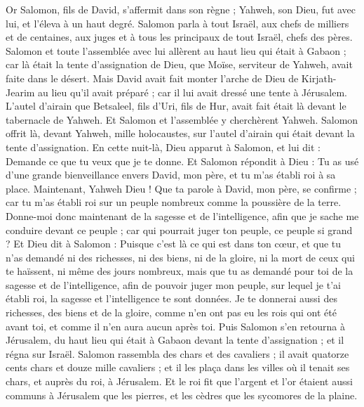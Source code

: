 \begin{multicols}{2}
\VerseOne{}Or Salomon, fils de David, s'affermit dans son règne ; Yahweh, son Dieu, fut avec lui, et l'éleva à un haut degré.
Salomon parla à tout Israël, aux chefs de milliers et de centaines, aux juges et à tous les principaux de tout Israël, chefs des pères.
Salomon et toute l'assemblée avec lui allèrent au haut lieu qui était à Gabaon ; car là était la tente d'assignation de Dieu, que Moïse, serviteur de Yahweh, avait faite dans le désert.
Mais David avait fait monter l'arche de Dieu de Kirjath-Jearim au lieu qu'il avait préparé ; car il lui avait dressé une tente à Jérusalem.
L'autel d'airain que Betsaleel, fils d'Uri, fils de Hur, avait fait était là devant le tabernacle de Yahweh. Et Salomon et l'assemblée y cherchèrent Yahweh.
Salomon offrit là, devant Yahweh, mille holocaustes, sur l'autel d'airain qui était devant la tente d'assignation.
En cette nuit-là, Dieu apparut à Salomon, et lui dit : Demande ce que tu veux que je te donne.
Et Salomon répondit à Dieu : Tu as usé d’une grande bienveillance envers David, mon père, et tu m'as établi roi à sa place.
Maintenant, Yahweh Dieu ! Que ta parole à David, mon père, se confirme ; car tu m'as établi roi sur un peuple nombreux comme la poussière de la terre.
Donne-moi donc maintenant de la sagesse et de l'intelligence, afin que je sache me conduire devant ce peuple ; car qui pourrait juger ton peuple, ce peuple si grand ?
Et Dieu dit à Salomon : Puisque c'est là ce qui est dans ton cœur, et que tu n'as demandé ni des richesses, ni des biens, ni de la gloire, ni la mort de ceux qui te haïssent, ni même des jours nombreux, mais que tu as demandé pour toi de la sagesse et de l'intelligence, afin de pouvoir juger mon peuple, sur lequel je t'ai établi roi,
la sagesse et l'intelligence te sont données. Je te donnerai aussi des richesses, des biens et de la gloire, comme n'en ont pas eu les rois qui ont été avant toi, et comme il n'en aura aucun après toi.
Puis Salomon s'en retourna à Jérusalem, du haut lieu qui était à Gabaon devant la tente d'assignation ; et il régna sur Israël.
Salomon rassembla des chars et des cavaliers ; il avait quatorze cents chars et douze mille cavaliers ; et il les plaça dans les villes où il tenait ses chars, et auprès du roi, à Jérusalem.
Et le roi fit que l'argent et l'or étaient aussi communs à Jérusalem que les pierres, et les cèdres que les sycomores de la plaine.

\end{multicols}
